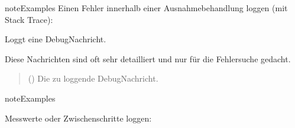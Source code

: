 \documentclass[letterpaper,10pt,english]{sphinxmanual}
\begin{document}
\begin{fulllineitems}
\begin{fulllineitems}
\begin{sphinxadmonition}{note}{Examples}
\sphinxAtStartPar
Einen Fehler innerhalb einer Ausnahmebehandlung loggen (mit Stack Trace):

\begin{sphinxVerbatim}[commandchars=\\\{\}]
        
   
     
\end{sphinxVerbatim}
\end{sphinxadmonition}

\end{fulllineitems}


\begin{fulllineitems}
\label{\detokenize{modulab/log_manager:modules.log.LogManager.LogManager.debug}}
\pysigstartsignatures
\pysiglinewithargsret
{}
{}
{}
\pysigstopsignatures
\sphinxAtStartPar
Loggt eine Debug\sphinxhyphen{}Nachricht.

\sphinxAtStartPar
Diese Nachrichten sind oft sehr detailliert und nur für die
Fehlersuche gedacht.
\begin{quote}\begin{description}
\sphinxAtStartPar
{} () \textendash{} Die zu loggende Debug\sphinxhyphen{}Nachricht.

\end{description}\end{quote}

\begin{sphinxadmonition}{note}{Examples}

\sphinxAtStartPar
Messwerte oder Zwischenschritte loggen:


\end{sphinxadmonition}
\end{fulllineitems}
\end{fulllineitems}
\end{document}
